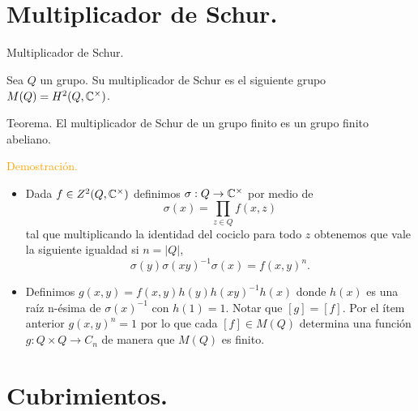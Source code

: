 \documentclass[aspectratio=169, 9pt]{beamer}
\begin{document}
\section[Multiplicador de Schur.]{Multiplicador de Schur.}
\begin{frame}[fragile]{Multiplicador de Schur.}

Sea $Q$ un grupo. Su \alert{multiplicador de Schur} es el siguiente grupo $M(Q) = H^2(Q, \Bbb C^\times)$. \pause
{}
\begin{alertblock}{Teorema.}
	El multiplicador de Schur de un grupo finito es un grupo finito abeliano.
\end{alertblock} \pause
\textcolor{orange}{Demostración.}
\begin{itemize}
	\item Dada $f \in Z^2(Q, \Bbb C^\times)$ definimos $\sigma:Q \to \Bbb C^\times$ por medio de
	\begin{equation*}
		\sigma(x) = \prod_{z \in Q} f(x,z)
	\end{equation*} \pause
	tal que multiplicando la identidad del cociclo para todo $z$ obtenemos que vale la siguiente igualdad si $n=|Q|$,
	\begin{equation*}
		\sigma(y)\sigma(xy)^{-1}\sigma(x) = f(x,y)^n.
	\end{equation*} \pause
	\item Definimos $g(x,y)=f(x,y)h(y)h(xy)^{-1}h(x)$ donde $h(x)$ es una raíz n-ésima de $\sigma(x)^{-1}$ con $h(1)=1$. \pause Notar que $[g]=[f]$. Por el ítem anterior $g(x,y)^n=1$ por lo que cada $[f] \in M(Q)$ determina una función $g:Q \times Q \to C_n$ de manera que $M(Q)$ es finito.
\end{itemize}

\end{frame}

\section[Cubrimientos.]{Cubrimientos.}
\end{document}
